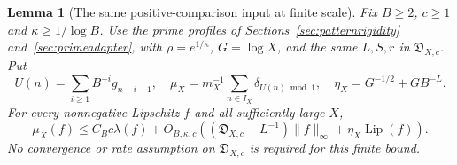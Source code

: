 \documentclass[11pt,a4paper]{article}
\newtheorem{lemma}[theorem]{Lemma}
\begin{document}
\begin{lemma}[The same positive-comparison input at finite scale]
\label{lem:quantlinear}
Fix $B\ge2$, $c\ge1$ and $\kappa\ge1/\log B$. Use the prime profiles
of Sections~\ref{sec:patternrigidity} and~\ref{sec:primeadapter}, with
$\rho=e^{1/\kappa}$, $G=\log X$, and the same $L,S,r$ in
$\mathfrak D_{X,c}$. Put
\[
 U(n)=\sum_{i\ge1}B^{-i}g_{n+i-1},\quad
 \mu_X=m_X^{-1}\sum_{n\in I_X}\delta_{U(n)\bmod1},\quad
 \eta_X=G^{-1/2}+GB^{-L}.
\]
For every nonnegative Lipschitz $f$ and all sufficiently large $X$,
\begin{equation}\label{eq:quantlinear}
 \mu_X(f)\le C_Bc\lambda(f)+
 O_{B,\kappa,c}\!\left(
   (\mathfrak D_{X,c}+L^{-1})\|f\|_\infty
                     +\eta_X\operatorname{Lip}(f)\right).
\end{equation}
No convergence or rate assumption on $\mathfrak D_{X,c}$ is required
for this finite bound.
\end{lemma}
\end{document}
